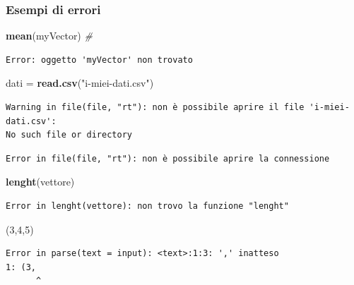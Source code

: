 \documentclass[
  a4paper,
  DIV=11,
  numbers=noendperiod]{scrreprt}
\newenvironment{Shaded}{\begin{snugshade}}{\end{snugshade}}
\newcommand{\CommentTok}[1]{\textcolor[rgb]{0.56,0.35,0.01}{\textit{#1}}}
\newcommand{\DecValTok}[1]{\textcolor[rgb]{0.00,0.00,0.81}{#1}}
\newcommand{\FunctionTok}[1]{\textcolor[rgb]{0.13,0.29,0.53}{\textbf{#1}}}
\newcommand{\NormalTok}[1]{#1}
\newcommand{\OtherTok}[1]{\textcolor[rgb]{0.56,0.35,0.01}{#1}}
\newcommand{\StringTok}[1]{\textcolor[rgb]{0.31,0.60,0.02}{#1}}
\begin{document}
\subsubsection{Esempi di errori}\label{esempi-di-errori}

\begin{Shaded}
\begin{Highlighting}[]
\FunctionTok{mean}\NormalTok{(myVector)  }\CommentTok{\#}
\end{Highlighting}
\end{Shaded}

\begin{verbatim}
Error: oggetto 'myVector' non trovato
\end{verbatim}

\begin{Shaded}
\begin{Highlighting}[]
\NormalTok{dati }\OtherTok{=} \FunctionTok{read.csv}\NormalTok{(}\StringTok{"i{-}miei{-}dati.csv"}\NormalTok{)}
\end{Highlighting}
\end{Shaded}

\begin{verbatim}
Warning in file(file, "rt"): non è possibile aprire il file 'i-miei-dati.csv':
No such file or directory
\end{verbatim}

\begin{verbatim}
Error in file(file, "rt"): non è possibile aprire la connessione
\end{verbatim}

\begin{Shaded}
\begin{Highlighting}[]
\FunctionTok{lenght}\NormalTok{(vettore)}
\end{Highlighting}
\end{Shaded}

\begin{verbatim}
Error in lenght(vettore): non trovo la funzione "lenght"
\end{verbatim}

\begin{Shaded}
\begin{Highlighting}[]
\NormalTok{(}\DecValTok{3}\NormalTok{,}\DecValTok{4}\NormalTok{,}\DecValTok{5}\NormalTok{)}
\end{Highlighting}
\end{Shaded}

\begin{verbatim}
Error in parse(text = input): <text>:1:3: ',' inatteso
1: (3,
      ^
\end{verbatim}
\end{document}
